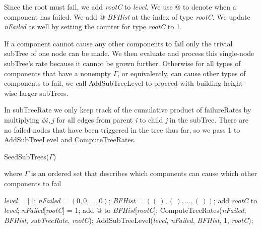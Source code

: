 \documentclass[12pt]{article}
\newcommand{\Varname}[1]{\textrm{\it#1}}
\begin{document}
Since the root must fail, we add \Varname{rootC} to \Varname{level}. We use @ to denote when a component has failed. We add @ \Varname{BFHist} at the index of type \Varname{rootC}. We update \Varname{nFailed} as well by setting the counter for type \Varname{rootC} to 1.         

If a component cannot cause any other components to fail only the trivial subTree of one node can be made. We then evaluate and process this single-node subTree's rate because it cannot be grown further. Otherwise for all types of components that have a nonempty $\Gamma$, or equivalently, can cause other types of components to fail, we call AddSubTreeLevel to proceed with building height-wise larger subTrees. 

In subTreeRate we only keep track of the cumulative product of failureRates by multiplying $\phi{i, j}$ for all edges from parent \Varname{i} to child \Varname{j} in the subTree. There are no failed nodes that have been triggered in the tree thus far, so we pass 1 to AddSubTreeLevel and ComputeTreeRates.\\

\begin{algorithm}
\caption{SeedSubTrees($\Gamma$)}
\label{alg:SeedSubTrees}
where $\Gamma$ is an ordered set that describes which components can cause which other components to fail\\
\begin{algorithmic}[1]
\FOR{\Varname{rootC} $\in$ \Varname{compSet}}
  \STATE \Varname{level} = [ ]; 
  \STATE \Varname{nFailed} = $(0, 0, \ldots, 0)$; 
  \STATE \Varname{BFHist} = $ ((\,), (\,), \ldots, (\,)) $; 
  \STATE add \Varname{rootC} to \Varname{level};
  \STATE \Varname{nFailed}[\Varname{rootC}] = 1;
  \STATE add @ to \Varname{BFHist}[\Varname{rootC}]; 
  \IF{Empty($\Gamma_{\Varname{rootC}}$)}
    \STATE ComputeTreeRates(\Varname{nFailed}, \Varname{BFHist}, \Varname{subTreeRate}, \Varname{rootC});
  \ELSE
    \STATE AddSubTreeLevel(\Varname{level}, \Varname{nFailed}, \Varname{BFHist}, 1, \Varname{rootC});
  \ENDIF
\ENDFOR
\end{algorithmic}
\end{algorithm}
\end{document}
